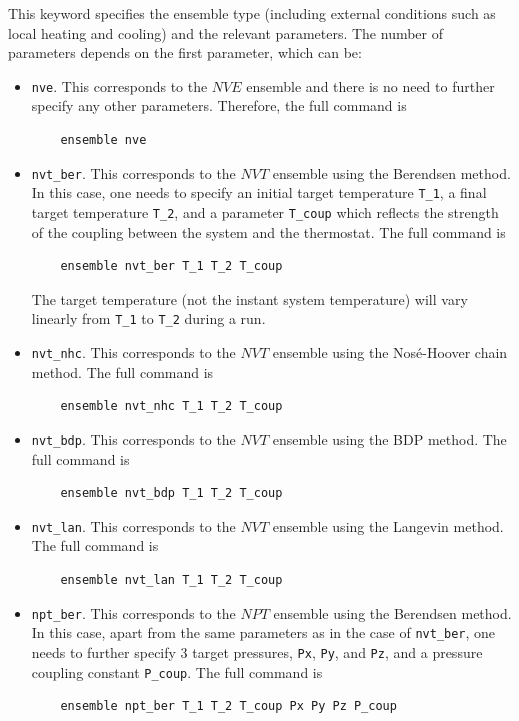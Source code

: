 \documentclass[12pt,a4paper]{report}
\begin{document}
This keyword specifies the ensemble type (including external conditions such as local heating and cooling) and the relevant parameters. The number of parameters depends on the first parameter, which can be:
\begin{itemize}

\item \verb"nve". This corresponds to the $NVE$ ensemble and there is no need to further specify any other parameters. Therefore, the full command is
\begin{verbatim}
    ensemble nve
\end{verbatim}

\item \verb"nvt_ber". This corresponds to the $NVT$ ensemble using the Berendsen method. In this case, one needs to specify an initial target temperature \verb"T_1", a final target temperature \verb"T_2", and a parameter \verb"T_coup" which reflects the strength of the coupling between the system and the thermostat. The full command is
\begin{verbatim}
    ensemble nvt_ber T_1 T_2 T_coup
\end{verbatim}
The target temperature (not the instant system temperature) will vary linearly from \verb"T_1" to \verb"T_2" during a run.

\item \verb"nvt_nhc". This corresponds to the $NVT$ ensemble using the Nos\'{e}-Hoover chain method. The full command is
\begin{verbatim}
    ensemble nvt_nhc T_1 T_2 T_coup
\end{verbatim}

\item \verb"nvt_bdp". This corresponds to the $NVT$ ensemble using the BDP method. The full command is
\begin{verbatim}
    ensemble nvt_bdp T_1 T_2 T_coup
\end{verbatim}

\item \verb"nvt_lan". This corresponds to the $NVT$ ensemble using the Langevin method. The full command is
\begin{verbatim}
    ensemble nvt_lan T_1 T_2 T_coup
\end{verbatim}

\item \verb"npt_ber". This corresponds to the $NPT$ ensemble using the Berendsen method. In this case, apart from the same parameters as in the case of \verb"nvt_ber", one needs to further specify 3 target pressures, \verb"Px", \verb"Py", and \verb"Pz", and a pressure coupling constant \verb"P_coup". The full command is
\begin{verbatim}
    ensemble npt_ber T_1 T_2 T_coup Px Py Pz P_coup
\end{verbatim}


\end{itemize}
\end{document}
